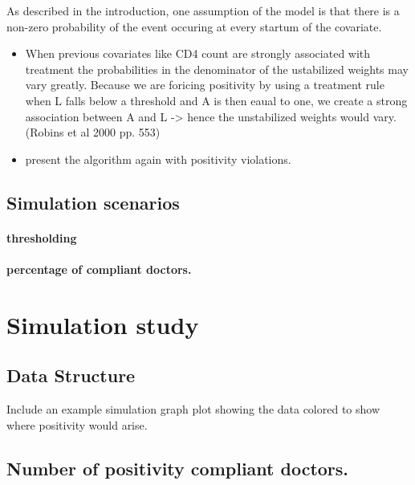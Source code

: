 \documentclass[11pt]{article}
\providecommand{\tightlist}{%
      \setlength{\itemsep}{0pt}\setlength{\parskip}{0pt}}
\begin{document}
As described in the introduction, one assumption of the model is that
there is a non-zero probability of the event occuring at every startum
of the covariate.

\begin{itemize}
\tightlist
\item
  When previous covariates like CD4 count are strongly associated with
  treatment the probabilities in the denominator of the ustabilized
  weights may vary greatly. Because we are foricing positivity by using
  a treatment rule when L falls below a threshold and A is then eaual to
  one, we create a strong association between A and L -\textgreater{}
  hence the unstabilized weights would vary. (Robins et al 2000 pp. 553)
\item
  present the algorithm again with positivity violations.
\end{itemize}

\subsection{Simulation scenarios}\label{simulation-scenarios}

\paragraph{thresholding}\label{thresholding}

\paragraph{percentage of compliant
doctors.}\label{percentage-of-compliant-doctors.}

    \section{Simulation study}\label{simulation-study}

\subsection{Data Structure}\label{data-structure}

Include an example simulation graph plot showing the data colored to
show where positivity would arise.

\subsection{Number of positivity compliant
doctors.}\label{number-of-positivity-compliant-doctors.}
\end{document}
